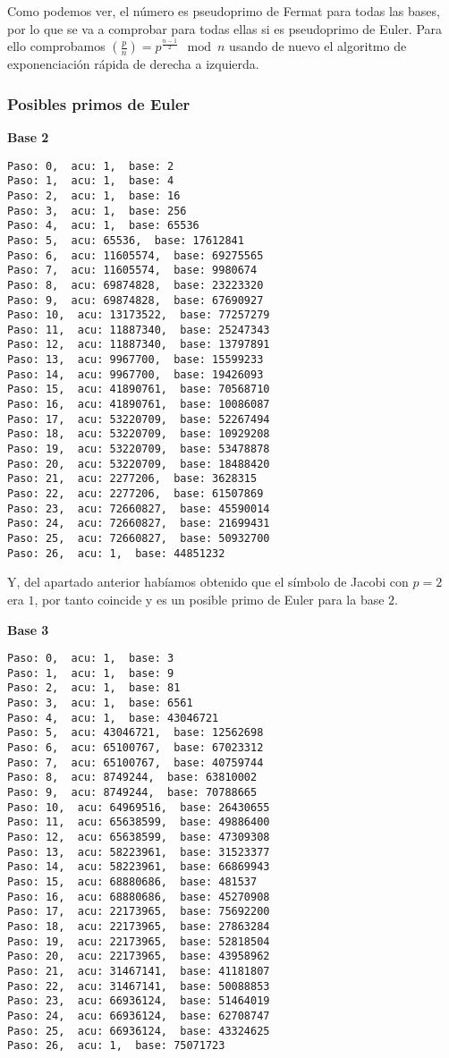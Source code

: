 \documentclass[a4paper]{article}
\begin{document}
Como podemos ver, el número es pseudoprimo de Fermat para todas las bases, por lo que se va a comprobar para todas ellas si es pseudoprimo de Euler. Para ello comprobamos $\left( \frac{p}{n} \right)= p^{\frac{n-1}{2}}\mod n$ usando de nuevo el algoritmo de exponenciación rápida de derecha a izquierda.

\subsubsection{Posibles primos de Euler}

\textbf{Base 2}
\begin{verbatim}
Paso: 0,  acu: 1,  base: 2  
Paso: 1,  acu: 1,  base: 4  
Paso: 2,  acu: 1,  base: 16  
Paso: 3,  acu: 1,  base: 256  
Paso: 4,  acu: 1,  base: 65536  
Paso: 5,  acu: 65536,  base: 17612841  
Paso: 6,  acu: 11605574,  base: 69275565  
Paso: 7,  acu: 11605574,  base: 9980674  
Paso: 8,  acu: 69874828,  base: 23223320  
Paso: 9,  acu: 69874828,  base: 67690927  
Paso: 10,  acu: 13173522,  base: 77257279  
Paso: 11,  acu: 11887340,  base: 25247343  
Paso: 12,  acu: 11887340,  base: 13797891  
Paso: 13,  acu: 9967700,  base: 15599233  
Paso: 14,  acu: 9967700,  base: 19426093  
Paso: 15,  acu: 41890761,  base: 70568710  
Paso: 16,  acu: 41890761,  base: 10086087  
Paso: 17,  acu: 53220709,  base: 52267494  
Paso: 18,  acu: 53220709,  base: 10929208  
Paso: 19,  acu: 53220709,  base: 53478878  
Paso: 20,  acu: 53220709,  base: 18488420  
Paso: 21,  acu: 2277206,  base: 3628315  
Paso: 22,  acu: 2277206,  base: 61507869  
Paso: 23,  acu: 72660827,  base: 45590014  
Paso: 24,  acu: 72660827,  base: 21699431  
Paso: 25,  acu: 72660827,  base: 50932700  
Paso: 26,  acu: 1,  base: 44851232  
\end{verbatim}

Y, del apartado anterior habíamos obtenido que el símbolo de Jacobi con $p=2$ era $1$, por tanto coincide y es un posible primo de Euler para la base $2$.

\textbf{Base 3}
\begin{verbatim}
Paso: 0,  acu: 1,  base: 3  
Paso: 1,  acu: 1,  base: 9  
Paso: 2,  acu: 1,  base: 81  
Paso: 3,  acu: 1,  base: 6561  
Paso: 4,  acu: 1,  base: 43046721  
Paso: 5,  acu: 43046721,  base: 12562698  
Paso: 6,  acu: 65100767,  base: 67023312  
Paso: 7,  acu: 65100767,  base: 40759744  
Paso: 8,  acu: 8749244,  base: 63810002  
Paso: 9,  acu: 8749244,  base: 70788665  
Paso: 10,  acu: 64969516,  base: 26430655  
Paso: 11,  acu: 65638599,  base: 49886400  
Paso: 12,  acu: 65638599,  base: 47309308  
Paso: 13,  acu: 58223961,  base: 31523377  
Paso: 14,  acu: 58223961,  base: 66869943  
Paso: 15,  acu: 68880686,  base: 481537  
Paso: 16,  acu: 68880686,  base: 45270908  
Paso: 17,  acu: 22173965,  base: 75692200  
Paso: 18,  acu: 22173965,  base: 27863284  
Paso: 19,  acu: 22173965,  base: 52818504  
Paso: 20,  acu: 22173965,  base: 43958962  
Paso: 21,  acu: 31467141,  base: 41181807  
Paso: 22,  acu: 31467141,  base: 50088853  
Paso: 23,  acu: 66936124,  base: 51464019  
Paso: 24,  acu: 66936124,  base: 62708747  
Paso: 25,  acu: 66936124,  base: 43324625  
Paso: 26,  acu: 1,  base: 75071723 
\end{verbatim}
\end{document}
